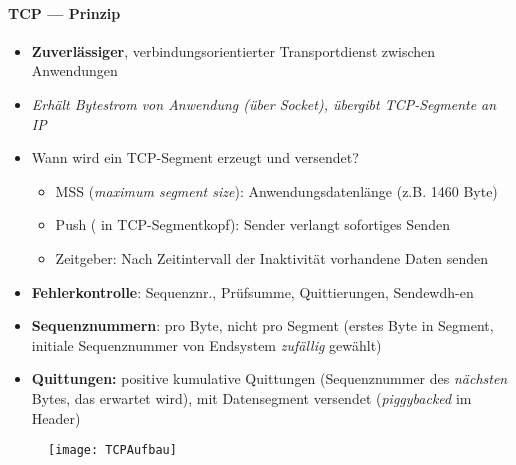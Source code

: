 \paragraph{TCP --- Prinzip}
\begin{itemize}
	\item \textbf{Zuverlässiger}, verbindungsorientierter Transportdienst zwischen Anwendungen
  \item \emph{Erhält Bytestrom von Anwendung (über Socket), übergibt TCP-Segmente an IP}
  \item Wann wird ein TCP-Segment erzeugt und versendet?
  \begin{itemize}
    \item MSS (\emph{maximum segment size}): Anwendungsdatenlänge (z.B. 1460 Byte)
    \item Push ( in TCP-Segmentkopf): Sender verlangt sofortiges Senden
    \item Zeitgeber: Nach Zeitintervall der Inaktivität vorhandene Daten senden
  \end{itemize}
  \item \textbf{Fehlerkontrolle}: Sequenznr., Prüfsumme, Quittierungen, Sendewdh-en
  \item \textbf{Sequenznummern}: pro Byte, nicht pro Segment (erstes Byte in Segment, initiale Sequenznummer von Endsystem \emph{zufällig} gewählt)
  \item \textbf{Quittungen: } positive kumulative Quittungen (Sequenznummer des \emph{nächsten} Bytes, das erwartet wird), mit Datensegment versendet (\emph{piggybacked} im Header)
\end{itemize}
\begin{figure}[H]\centering\label{TCPAufbau}\texttt{[image: TCPAufbau]}\end{figure}

